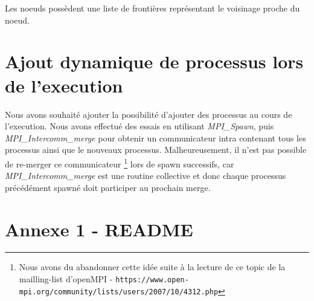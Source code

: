 \documentclass[a4paper, 11pt, french]{article}
\begin{document}
Les noeuds possèdent une liste de frontières représentant le voisinage proche du noeud.

\section {Ajout dynamique de processus lors de l'execution}
Nous avons souhaité ajouter la possibilité d'ajouter des processus au cours de l'execution. Nous avons effectué des essais en utilisant \textit{MPI\_Spawn}, puis \textit{MPI\_Intercomm\_merge} pour obtenir un communicateur intra contenant tous les processus ainsi que le nouveaux processus. Malheureusement, il n'est pas possible de re-merger ce communicateur \footnote{Nous avons du abandonner cette idée suite à la lecture de ce topic de la mailling-list d'openMPI - \texttt{https://www.open-mpi.org/community/lists/users/2007/10/4312.php}} lors de spawn successifs, car \textit{MPI\_Intercomm\_merge} est une routine collective et donc chaque processus précédément spawné doit participer au prochain merge. 

\appendix %
\section{Annexe 1 - README}

\end{document}
